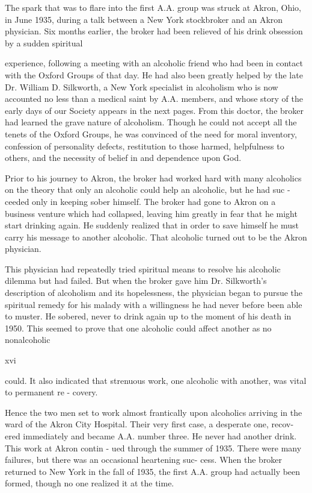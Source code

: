 The spark that was to ﬂare into the ﬁrst A.A. group
was struck at Akron, Ohio, in June 1935, during a talk
between a New York stockbroker and an Akron
physician. Six months earlier, the broker had been
relieved of his drink obsession by a sudden spiritual


experience, following a meeting with an alcoholic
friend who had been in contact with the Oxford
Groups of that day. He had also been greatly helped
by the late Dr. William D. Silkworth, a New York
specialist in alcoholism who is now accounted no less
than a medical saint by A.A. members, and whose
story of the early days of our Society appears in the
next pages. From this doctor, the broker had learned
the grave nature of alcoholism. Though he could not
accept all the tenets of the Oxford Groups, he was
convinced of the need for moral inventory, confession
of personality defects, restitution to those harmed,
helpfulness to others, and the necessity of belief in and
dependence upon God.

Prior to his journey to Akron, the broker had worked
hard with many alcoholics on the theory that only an
alcoholic could help an alcoholic, but he had suc -
ceeded only in keeping sober himself. The broker had
gone to Akron on a business venture which had
collapsed, leaving him greatly in fear that he might
start drinking again. He suddenly realized that in
order to save himself he must carry his message to
another alcoholic. That alcoholic turned out to be
the Akron physician.

This physician had repeatedly tried spiritual means
to resolve his alcoholic dilemma but had failed. But
when the broker gave him Dr. Silkworth’s description
of alcoholism and its hopelessness, the physician began
to pursue the spiritual remedy for his malady with a
willingness he had never before been able to muster.
He sobered, never to drink again up to the moment of
his death in 1950. This seemed to prove that one
 alcoholic could affect another as no nonalcoholic

xvi

could. It also indicated that strenuous work, one
alcoholic with another, was vital to permanent re -
covery.

Hence the two men set to work almost frantically
upon alcoholics arriving in the ward of the Akron City
Hospital. Their very ﬁrst case, a desperate one, recov-
ered immediately and became A.A. number three. He
never had another drink. This work at Akron contin -
ued through the summer of 1935. There were many
failures, but there was an occasional heartening suc-
cess. When the broker returned to New York in the fall
of 1935, the ﬁrst A.A. group had actually been formed,
though no one realized it at the time.


